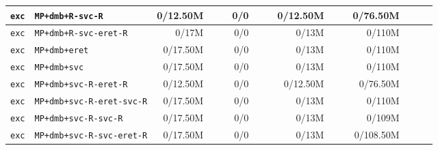 \begin{tabular}{l l  | r r l | r r l | r r l | r r l l}
            \verb|exc| &                                      \verb|MP+dmb+R-svc-R| &       0/12.50M &                       &                   &            0/0 &                       &  &       0/12.50M &                       &                   &       0/76.50M &                       &                   & \\ \hline 
            \verb|exc| &                                 \verb|MP+dmb+R-svc-eret-R| &          0/17M &                       &                   &            0/0 &                       &  &          0/13M &                       &                   &         0/110M &                       &                   & \\ \hline 
            \verb|exc| &                                         \verb|MP+dmb+eret| &       0/17.50M &                       &                   &            0/0 &                       &  &          0/13M &                       &                   &         0/110M &                       &                   & \\ \hline 
            \verb|exc| &                                          \verb|MP+dmb+svc| &       0/17.50M &                       &                   &            0/0 &                       &  &          0/13M &                       &                   &         0/110M &                       &                   & \\ \hline 
            \verb|exc| &                                 \verb|MP+dmb+svc-R-eret-R| &       0/12.50M &                       &                   &            0/0 &                       &  &       0/12.50M &                       &                   &       0/76.50M &                       &                   & \\ \hline 
            \verb|exc| &                             \verb|MP+dmb+svc-R-eret-svc-R| &       0/17.50M &                       &                   &            0/0 &                       &  &          0/13M &                       &                   &         0/110M &                       &                   & \\ \hline 
            \verb|exc| &                                  \verb|MP+dmb+svc-R-svc-R| &       0/17.50M &                       &                   &            0/0 &                       &  &          0/13M &                       &                   &         0/109M &                       &                   & \\ \hline 
            \verb|exc| &                             \verb|MP+dmb+svc-R-svc-eret-R| &       0/17.50M &                       &                   &            0/0 &                       &  &          0/13M &                       &                   &      0/108.50M &                       &                   & \\ \hline 

\end{tabular}
